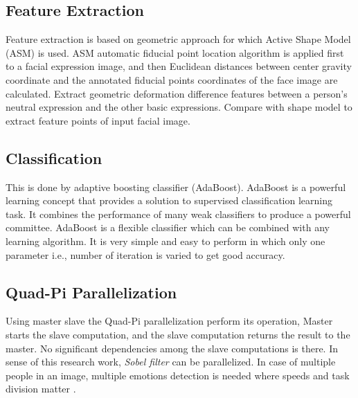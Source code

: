 \subsection{Feature Extraction}
Feature extraction is based on geometric approach for which Active Shape Model (ASM) is used. ASM automatic fiducial point location algorithm is applied first to a facial expression image, and then Euclidean distances between center gravity coordinate and the annotated fiducial points coordinates of the face image are calculated. Extract geometric deformation difference features between a person's neutral expression and the other basic expressions. Compare with shape model to extract feature points of input facial image.

\subsection{Classification}
This is done by adaptive boosting classifier (AdaBoost). AdaBoost is a powerful learning concept that provides a solution to supervised classification learning task. It combines the performance of many weak classifiers to produce a powerful committee. AdaBoost is a flexible classifier which can be combined with any learning algorithm. It is very simple and easy to perform in which only one parameter i.e., number of iteration is varied to get good accuracy.

\subsection{Quad-Pi Parallelization}
Using master slave the Quad-Pi parallelization perform its operation, Master starts the slave computation, and the slave computation returns the result to the master. No significant dependencies among the slave computations is there. In sense of this research work, \textit{Sobel filter} can be parallelized. In case of multiple people in an image, multiple emotions detection is needed where speeds and task division matter \cite{redmon2016}.